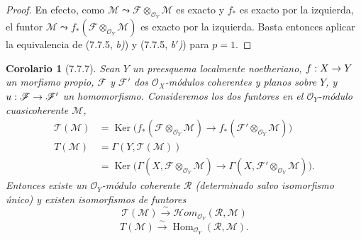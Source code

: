 \documentclass[10pt,oneside,openany]{book}
\theoremstyle{egaenv}\newtheorem*{env}{---}
\theoremstyle{egastatement}
\newtheorem*{corollary}{Corolario}
\theoremstyle{egadescription}
\renewcommand{\to}{\mathchoice{\longrightarrow}{\rightarrow}{\rightarrow}{\rightarrow}}
\begin{document}
\begin{proof}
En efecto, como $\mathscr M\leadsto\mathscr F\otimes_{\mathscr O_Y}\mathscr M$ es exacto
 y $f_*$ es exacto por la izquierda, el funtor
$\mathscr M\leadsto f_*(\mathscr F\otimes_{\mathscr O_Y}\mathscr M)$ es exacto por la izquierda. Basta entonces aplicar la equivalencia de (7.7.5, \emph{b)}) y (7.7.5, \emph{b$'$)}) para $p=1$.
\end{proof}

\begin{corollary}[7.7.7]
\label{III.7.7.7}
Sean $Y$ un preesquema localmente noetheriano, $f:X\to Y$ un morfismo propio,
$\mathscr F$ y $\mathscr F'$ dos $\mathscr O_X$-módulos coherentes y planos
sobre $Y$, y $u:\mathscr F\to\mathscr F'$ un homomorfismo. Consideremos los
dos funtores en el $\mathscr O_Y$-módulo cuasicoherente $\mathscr M$,
\begin{align*}
  \mathscr T(\mathscr M)
  &=
  \operatorname{Ker}
  \bigl(
    f_*(\mathscr F\otimes_{\mathscr O_Y}\mathscr M)
    \longrightarrow
    f_*(\mathscr F'\otimes_{\mathscr O_Y}\mathscr M)
  \bigr)\\
  T(\mathscr M)
  &=
  \Gamma(Y,\mathscr T(\mathscr M))\\
  &=
  \operatorname{Ker}
  \bigl(
    \Gamma(X,\mathscr F\otimes_{\mathscr O_Y}\mathscr M)
    \longrightarrow
    \Gamma(X,\mathscr F'\otimes_{\mathscr O_Y}\mathscr M)
  \bigr).
\end{align*}
Entonces existe un $\mathscr O_Y$-módulo coherente $\mathscr R$ (determinado
salvo isomorfismo único) y existen isomorfismos de funtores
\[
  \mathscr T(\mathscr M)
  \xrightarrow{\sim}
  \mathscr{H}\!om_{\mathscr O_Y}(\mathscr R,\mathscr M)
  \tag{7.7.7.1}\label{III.7.7.7.1.fr}
\]
\[
  T(\mathscr M)
  \xrightarrow{\sim}
  \operatorname{Hom}_{\mathscr O_Y}(\mathscr R,\mathscr M).
  \tag{7.7.7.2}\label{III.7.7.7.2.fr}
\]
\end{corollary}
\end{document}
